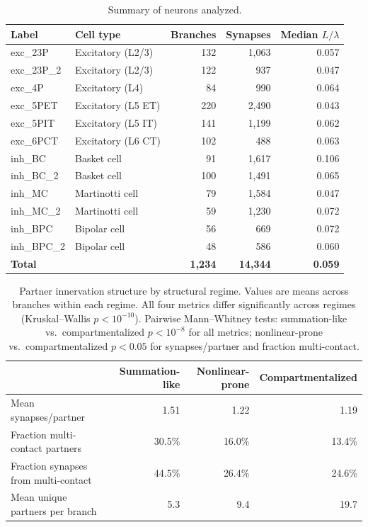 \documentclass[11pt]{article}
\begin{document}
\begin{table}[H]
\centering
\caption{Summary of neurons analyzed.}
\label{tab:neurons}
\begin{tabular}{llrrr}
\toprule
Label & Cell type & Branches & Synapses & Median $L/\lambda$ \\
\midrule
exc\_23P & Excitatory (L2/3) & 132 & 1,063 & 0.057 \\
exc\_23P\_2 & Excitatory (L2/3) & 122 & 937 & 0.047 \\
exc\_4P & Excitatory (L4) & 84 & 990 & 0.064 \\
exc\_5PET & Excitatory (L5 ET) & 220 & 2,490 & 0.043 \\
exc\_5PIT & Excitatory (L5 IT) & 141 & 1,199 & 0.062 \\
exc\_6PCT & Excitatory (L6 CT) & 102 & 488 & 0.063 \\
inh\_BC & Basket cell & 91 & 1,617 & 0.106 \\
inh\_BC\_2 & Basket cell & 100 & 1,491 & 0.065 \\
inh\_MC & Martinotti cell & 79 & 1,584 & 0.047 \\
inh\_MC\_2 & Martinotti cell & 59 & 1,230 & 0.072 \\
inh\_BPC & Bipolar cell & 56 & 669 & 0.072 \\
inh\_BPC\_2 & Bipolar cell & 48 & 586 & 0.060 \\
\midrule
\textbf{Total} & & \textbf{1,234} & \textbf{14,344} & \textbf{0.059} \\
\bottomrule
\end{tabular}
\end{table}

\begin{table}[H]
\centering
\caption{Partner innervation structure by structural regime. Values are means across branches within each regime. All four metrics differ significantly across regimes (Kruskal--Wallis $p < 10^{-10}$). Pairwise Mann--Whitney tests: summation-like vs.\ compartmentalized $p < 10^{-8}$ for all metrics; nonlinear-prone vs.\ compartmentalized $p < 0.05$ for synapses/partner and fraction multi-contact.}
\label{tab:partner}
\begin{tabular}{lrrr}
\toprule
& Summation-like & Nonlinear-prone & Compartmentalized \\
\midrule
Mean synapses/partner & 1.51 & 1.22 & 1.19 \\
Fraction multi-contact partners & 30.5\% & 16.0\% & 13.4\% \\
Fraction synapses from multi-contact & 44.5\% & 26.4\% & 24.6\% \\
Mean unique partners per branch & 5.3 & 9.4 & 19.7 \\
\bottomrule
\end{tabular}
\end{table}
\end{document}

